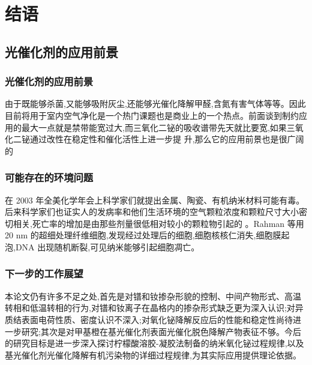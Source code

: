 \documentclass[xetex,compress]{mybeamer}
\begin{document}
\section{结语}
\subsection{光催化剂的应用前景}
\begin{frame}
\frametitle{光催化剂的应用前景}
\begin{block}{}
由于既能够杀菌,又能够吸附灰尘,还能够光催化降解甲醛,含氮有害气体等等。因此目前将用于室内空气净化是一个热门课题也是商业上的一个热点。前面谈到制约应用的最大一点就是禁带能宽过大,而三氧化二铋的吸收谱带先天就比要宽,如果三氧化二铋通过改性在稳定性和催化活性上进一步提
升,那么它的应用前景也是很广阔的
\end{block}
\end{frame}


\begin{frame}
\frametitle{可能存在的环境问题}
\begin{block}{}
在 2003 年全美化学年会上科学家们就提出金属、陶瓷、有机纳米材料可能有毒。后来科学家们也证实人的发病率和他们生活环境的空气颗粒浓度和颗粒尺寸大小密切相关,死亡率的增加是由那些剂量很低相对较小的颗粒物引起的 。Rahman 等用 20 nm 的超细处理纤维细胞,发现经过处理后的细胞,细胞核核仁消失,细胞膜起泡,DNA 出现随机断裂,可见纳米能够引起细胞凋亡。
\end{block}
\end{frame}

\begin{frame}
\frametitle{下一步的工作展望}
\begin{block}{}
本论文仍有许多不足之处,首先是对镨和钕掺杂形貌的控制、中间产物形式、高温转相和低温转相的行为,对镨和钕离子在晶格内的掺杂形式缺乏更为深入认识;对异质结表面电荷性质、密度认识不深入;对氧化铋降解反应后的性能和稳定性尚待进一步研究;其次是对甲基橙在基光催化剂表面光催化脱色降解产物表征不够。今后的研究目标是进一步深入探讨柠檬酸溶胶-凝胶法制备的纳米氧化铋过程规律,以及基光催化剂光催化降解有机污染物的详细过程规律,为其实际应用提供理论依据。
\end{block}
\end{frame}
\end{document}
